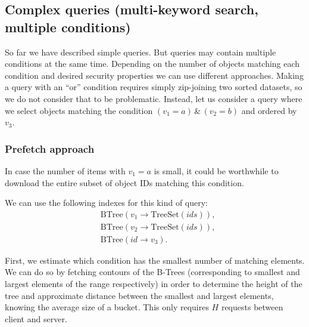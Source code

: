 \documentclass[notitlepage,longbibliography]{revtex4-1}
\begin{document}
\subsection{Complex queries (multi-keyword search, multiple conditions)}

So far we have described simple queries.
But queries may contain multiple conditions at the same time.
Depending on the number of objects matching each condition and desired security properties we can use different approaches.
Making a query with an ``or'' condition requires simply zip-joining two sorted datasets, so we do not consider that to be problematic.
Instead, let us consider a query where we select objects matching the condition $(v_1 = a) \,\&\, (v_2 = b)$ and ordered by $v_3$.

\subsubsection{Prefetch approach}
\label{sec:prefetch}
%

In case the number of items with $v_1=a$ is small, it could be worthwhile to download the entire subset of object IDs matching this condition.

We can use the following indexes for this kind of query:
\begin{align*}
    & \mbox{BTree}(v_1 \rightarrow \mbox{TreeSet}(ids)),\\
    & \mbox{BTree}(v_2 \rightarrow \mbox{TreeSet}(ids)),\\
    & \mbox{BTree}(id \rightarrow v_3).
\end{align*}

First, we estimate which condition has the smallest number of matching elements.
We can do so by fetching contours of the B-Trees (corresponding to smallest and largest elements of the range respectively) in order to determine the height of the tree and approximate distance between the smallest and largest elements, knowing the average size of a bucket. This only requires $H$ requests between client and server.
\end{document}
